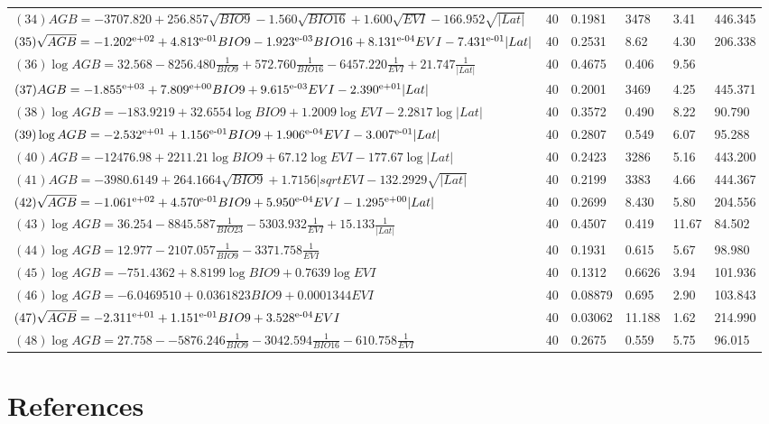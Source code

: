 \documentclass[review, authoryear]{elsarticle}   	%
\begin{document}
\begin{table}[htbp]
\begin{tabular}{p{8cm}p{0.5cm}p{1.0cm}p{1.0cm}p{1.0cm}p{1.0cm}}
$(34)AGB=-3707.820+256.857\sqrt{BIO9}-1.560\sqrt{BIO16}+1.600\sqrt{EVI}-166.952\sqrt{|Lat|}$&40&0.1981&3478&3.41&446.345\\
$(35)\sqrt{AGB}=-1.202\textsuperscript{e+02}+4.813\textsuperscript{e-01}BIO9-1.923\textsuperscript{e-03}BIO16+8.131\textsuperscript{e-04}EVI-7.431\textsuperscript{e-01}|Lat|$&40&0.2531&8.62&4.30&206.338\\
$(36)\log{AGB}=32.568-8256.480\frac{1}{BIO9}+572.760\frac{1}{BIO16}-6457.220\frac{1}{EVI}+21.747\frac{1}{|Lat|}$&40&0.4675&0.406&9.56&\84.130\\ 
$(37)AGB=-1.855\textsuperscript{e+03}+7.809\textsuperscript{e+00}BIO9+9.615\textsuperscript{e-03}EVI-2.390\textsuperscript{e+01}|Lat|$&40&0.2001&3469&4.25&445.371\\
$(38)\log{AGB}=-183.9219+32.6554\log{BIO9}+1.2009\log{EVI}-2.2817\log{|Lat|}$&40&0.3572&0.490&8.22&90.790\\
$(39)\log{AGB}=-2.532\textsuperscript{e+01}+1.156\textsuperscript{e-01}BIO9+1.906\textsuperscript{e-04}EVI-3.007\textsuperscript{e-01}|Lat|$&40&0.2807&0.549&6.07&95.288\\
$(40)AGB=-12476.98+2211.21\log{BIO9}+67.12\log{EVI}-177.67\log{|Lat|}$&40&0.2423&3286&5.16&443.200\\ 
$(41)AGB=-3980.6149+264.1664\sqrt{BIO9}+1.7156|sqrt{EVI}-132.2929\sqrt{|Lat|}$&40&0.2199&3383&4.66&444.367\\
$(42)\sqrt{AGB}=-1.061\textsuperscript{e+02}+4.570\textsuperscript{e-01}BIO9+5.950\textsuperscript{e-04}EVI-1.295\textsuperscript{e+00}|Lat|$&40&0.2699&8.430&5.80&204.556\\
$(43)\log{AGB}=36.254-8845.587\frac{1}{BIO23}-5303.932\frac{1}{EVI}+15.133\frac{1}{|Lat|}$&40&0.4507&0.419&11.67&84.502\\
$(44)\log{AGB}=12.977-2107.057\frac{1}{BIO9}-3371.758\frac{1}{EVI}$ &40&0.1931&0.615&5.67&98.980\\
$(45)\log{AGB}=-751.4362+8.8199\log{BIO9}+0.7639\log{EVI}$&40&0.1312&0.6626&3.94&101.936\\
$(46)\log{AGB}=-6.0469510+0.0361823BIO9+0.0001344EVI$&40&0.08879&0.695&2.90&103.843\\
$(47)\sqrt{AGB}=-2.311\textsuperscript{e+01}+1.151\textsuperscript{e-01}BIO9+3.528\textsuperscript{e-04}EVI$&40&0.03062&11.188&1.62&214.990\\   
$(48)\log{AGB}=27.758--5876.246\frac{1}{BIO9}-3042.594\frac{1}{BIO16}-610.758\frac{1}{EVI}$ &40&0.2675&0.559&5.75&96.015\\
      \bottomrule
  \end{tabular}
   \label{tab:models}
\end{table}


\section*{References}


%
\end{document}
